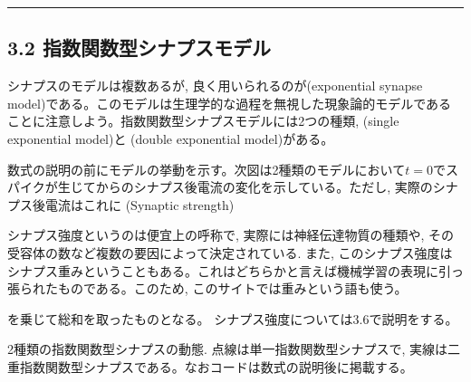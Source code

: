 \documentclass[letterpaper,10pt,english]{sphinxmanual}
\begin{document}
\bigskip\hrule\bigskip



\subsection{3.2 指数関数型シナプスモデル}
\label{\detokenize{3-3_expo-synapse:id1}}\label{\detokenize{3-3_expo-synapse::doc}}
シナプスのモデルは複数あるが, 良く用いられるのが(exponential synapse model)である。このモデルは生理学的な過程を無視した現象論的モデルであることに注意しよう。指数関数型シナプスモデルには2つの種類,  (single exponential model)と (double exponential model)がある。

数式の説明の前にモデルの挙動を示す。次図は2種類のモデルにおいて\(t=0\)でスパイクが生じてからのシナプス後電流の変化を示している。ただし, 実際のシナプス後電流はこれに (Synaptic strength)%
\begin{footnote}[1]\sphinxAtStartFootnote
シナプス強度というのは便宜上の呼称で, 実際には神経伝達物質の種類や, その受容体の数など複数の要因によって決定されている. また, このシナプス強度はシナプス重みということもある。これはどちらかと言えば機械学習の表現に引っ張られたものである。このため, このサイトでは重みという語も使う。
%
\end{footnote}を乗じて総和を取ったものとなる。 シナプス強度については3.6で説明をする。

2種類の指数関数型シナプスの動態. 点線は単一指数関数型シナプスで, 実線は二重指数関数型シナプスである。なおコードは数式の説明後に掲載する。
\end{document}
